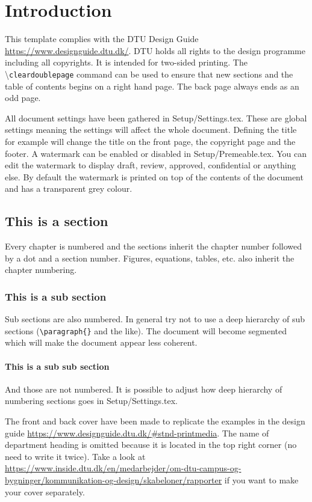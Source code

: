 \chapter{Introduction}
This template complies with the DTU Design Guide \url{https://www.designguide.dtu.dk/}. DTU holds all rights to the design programme including all copyrights. It is intended for two-sided printing. The \textbackslash \texttt{cleardoublepage} command can be used to ensure that new sections and the table of contents begins on a right hand page. The back page always ends as an odd page.

All document settings have been gathered in Setup/Settings.tex. These are global settings meaning the settings will affect the whole document. Defining the title for example will change the title on the front page, the copyright page and the footer. A watermark can be enabled or disabled in Setup/Premeable.tex. You can edit the watermark to display draft, review, approved, confidential or anything else. By default the watermark is printed on top of the contents of the document and has a transparent grey colour.

\section{This is a section}
Every chapter is numbered and the sections inherit the chapter number followed by a dot and a section number. Figures, equations, tables, etc. also inherit the chapter numbering.

\subsection{This is a sub section}
Sub sections are also numbered. In general try not to use a deep hierarchy of sub sections (\texttt{\textbackslash paragraph\{\}} and the like). The document will become segmented which will make the document appear less coherent.

\subsubsection{This is a sub sub section}
And those are not numbered. It is possible to adjust how deep hierarchy of numbering sections goes in Setup/Settings.tex.

The front and back cover have been made to replicate the examples in the design guide \url{https://www.designguide.dtu.dk/#stnd-printmedia}. The name of department heading is omitted  because it is located in the top right corner (no need to write it twice). Take a look at \url{https://www.inside.dtu.dk/en/medarbejder/om-dtu-campus-og-bygninger/kommunikation-og-design/skabeloner/rapporter} if you want to make your cover separately.

